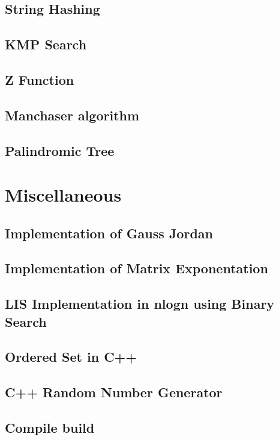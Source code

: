 \subsection{String Hashing}
\raggedbottom
\hrulefill
\subsection{KMP Search}
\raggedbottom
\hrulefill
\subsection{Z Function}
\raggedbottom
\hrulefill
\subsection{Manchaser algorithm}
\raggedbottom
\hrulefill
\subsection{Palindromic Tree}
\raggedbottom
\hrulefill

\section{Miscellaneous}
\subsection{Implementation of Gauss Jordan}
\raggedbottom
\hrulefill
\subsection{Implementation of Matrix Exponentation}
\raggedbottom
\hrulefill
\subsection{LIS Implementation in nlogn using Binary Search}
\raggedbottom
\hrulefill
\subsection{Ordered Set in C++}
\raggedbottom
\hrulefill
\subsection{C++ Random Number Generator}
\raggedbottom
\hrulefill
\subsection{Compile build}
\raggedbottom
\hrulefill


